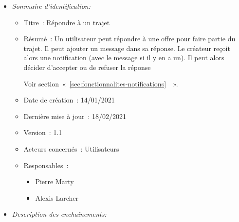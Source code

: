 \begin{itemize}

\item \textit{Sommaire d'identification:}

\begin{itemize}

\item Titre~: Répondre à un trajet

\item Résumé~: Un utilisateur peut répondre à une offre pour faire partie du trajet.
Il peut ajouter un message dans sa réponse.
Le créateur reçoit alors une notification (avec le message si il y en a un).
Il peut alors décider d'accepter ou de refuser la réponse 

Voir section~«~\ref{sec:fonctionnalites-notifications}~~».

\item Date de création~: 14/01/2021

\item Dernière mise à jour~: 18/02/2021

\item Version~: 1.1

\item Acteurs concernés~: Utilisateurs

\item Responsables~:
\begin{itemize}
            \item Pierre Marty
            \item Alexis Larcher
        \end{itemize}

\end{itemize}

\item \textit{Description des enchaînements:}


\end{itemize}
